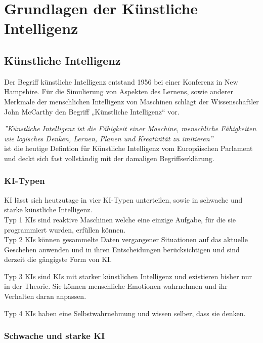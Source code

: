 \chapter{Grundlagen der Künstliche Intelligenz\label{cha:chapter2}}

\section{Künstliche Intelligenz\label{sec:bb}}

Der Begriff künstliche Intelligenz entstand 1956 bei einer 
Konferenz in New Hampshire. Für die Simulierung von Aspekten des 
Lernens, sowie anderer Merkmale der menschlichen Intelligenz von 
Maschinen schlägt der Wissenschaftler John McCarthy den Begriff 
„Künstliche Intelligenz“ vor. 
\cite{WasIstKuenstliche2021} \cite{WhatAIBasica}

\textit{''Künstliche Intelligenz ist die Fähigkeit einer Maschine, 
menschliche Fähigkeiten wie logisches Denken, Lernen, Planen und 
Kreativität zu imitieren''} \\ \cite{WasIstKuenstliche2020}
ist die heutige Defintion für Künstliche Intelligenz vom Europäischen Parlament 
und deckt sich fast vollständig mit der damaligen Begriffserklärung.

\subsection{KI-Typen}
KI lässt sich heutzutage in vier KI-Typen unterteilen, 
sowie in schwache und starke künstliche Intelligenz.
\\

Typ 1 KIs sind reaktive 
Maschinen welche eine einzige Aufgabe, für die sie programmiert wurden, 
erfüllen können.
\\

Typ 2 KIs können gesammelte Daten vergangener 
Situationen auf das aktuelle Geschehen anwenden und 
in ihren Entscheidungen berücksichtigen und sind derzeit die gängigste Form von KI.

Typ 3 KIs sind KIs mit starker künstlichen Intelligenz und 
existieren bisher nur in der Theorie. 
Sie können menschliche Emotionen wahrnehmen und ihr Verhalten daran anpassen.

Typ 4 KIs haben eine Selbstwahrnehmung und wissen selber, dass sie denken. 
\cite{stadlerKuenstlicheIntelligenz}

\subsection{Schwache und starke KI}

